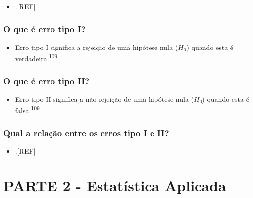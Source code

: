 \documentclass[
  a4paper,
]{book}
\providecommand{\tightlist}{%
  \setlength{\itemsep}{0pt}\setlength{\parskip}{0pt}}
\begin{document}
\begin{itemize}
\tightlist
\item
  .{[}REF{]}
\end{itemize}

\hypertarget{o-que-uxe9-erro-tipo-i}{%
\subsection{O que é erro tipo I?}\label{o-que-uxe9-erro-tipo-i}}

\begin{itemize}
\tightlist
\item
  Erro tipo I significa a rejeição de uma hipótese nula (\(H_{0}\)) quando esta é verdadeira.\textsuperscript{\protect\hyperlink{ref-Curran-Everett2009}{109}}
\end{itemize}

\hypertarget{o-que-uxe9-erro-tipo-ii}{%
\subsection{O que é erro tipo II?}\label{o-que-uxe9-erro-tipo-ii}}

\begin{itemize}
\tightlist
\item
  Erro tipo II significa a não rejeição de uma hipótese nula (\(H_{0}\)) quando esta é falsa.\textsuperscript{\protect\hyperlink{ref-Curran-Everett2009}{109}}
\end{itemize}

\hypertarget{qual-a-relauxe7uxe3o-entre-os-erros-tipo-i-e-ii}{%
\subsection{Qual a relação entre os erros tipo I e II?}\label{qual-a-relauxe7uxe3o-entre-os-erros-tipo-i-e-ii}}

\begin{itemize}
\tightlist
\item
  .{[}REF{]}
\end{itemize}


\hypertarget{parte-2---estatuxedstica-aplicada}{%
\chapter*{\texorpdfstring{\textbf{PARTE 2 - Estatística Aplicada}}{PARTE 2 - Estatística Aplicada}}\label{parte-2---estatuxedstica-aplicada}}
\end{document}
